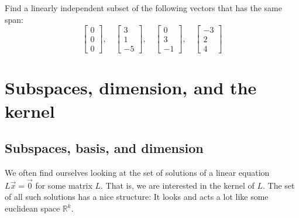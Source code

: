 \begin{exercise}
Find a linearly independent subset of the following vectors that has
the same span:
\begin{equation*}
\begin{bmatrix}
0 \\ 0 \\ 0
\end{bmatrix}
, \quad
\begin{bmatrix}
3 \\ 1 \\ -5
\end{bmatrix}
, \quad
\begin{bmatrix}
0 \\ 3 \\ -1
\end{bmatrix}
, \quad
\begin{bmatrix}
-3 \\ 2 \\ 4
\end{bmatrix}
\end{equation*}
\end{exercise}




\sectionnewpage
\section{Subspaces, dimension, and the kernel}
\label{subspaces:section}



\subsection{Subspaces, basis, and dimension}

We often find ourselves looking at the set of
solutions of a linear equation $L\vec{x} = \vec{0}$ for some matrix $L$.
That is, we are interested in the kernel of $L$.
The set of all such solutions has a nice structure:  It looks and
acts a lot like some euclidean space ${\mathbb R}^k$.


